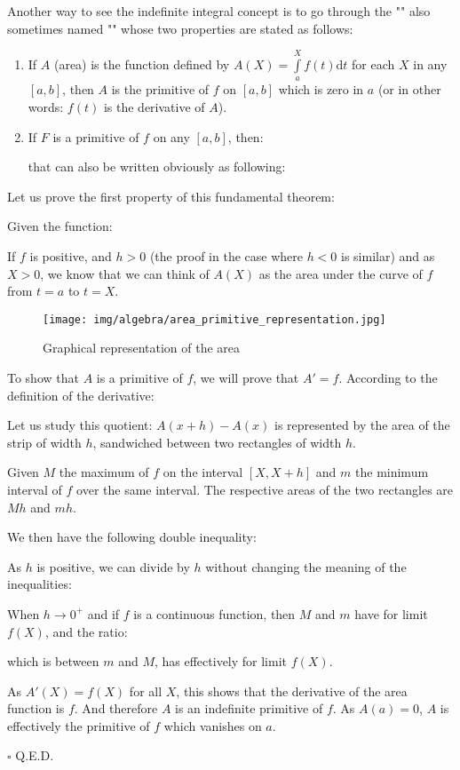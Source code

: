 	
	Another way to see the indefinite integral concept is to go through the "" also sometimes named "\label{fundamental theorem of calculus}" whose two properties are stated as follows:
	\begin{enumerate}
		\item If $A$ (area) is the function defined by $A(X)=\displaystyle\int\limits_a^X f(t)\mathrm{d}t$ for each $X$ in any $[a, b]$, then $A$ is the primitive of $f$ on $[a, b]$ which is zero in $a$ (or in other words: $f (t)$ is the derivative of $A$).
		\item If $F$ is a primitive of $f$ on any $[a, b]$, then:
		
		that can also be written obviously as following:
		
	\end{enumerate}
	Let us prove the first property of this fundamental theorem:
	\begin{dem}
	Given the function:
	
	If $f$ is positive, and $h>0$ (the proof in the case where $h<0$ is similar) and as $X>0$, we know that we can think of $A(X)$ as the area under the curve of $f$ from $t=a$ to $t=X$.
	\begin{figure}[H]
		\centering
		\texttt{[image: img/algebra/area\_primitive\_representation.jpg]}
		\caption{Graphical representation of the area}
	\end{figure}
	To show that $A$ is a primitive of $f$, we will prove that $A'=f$. According to the definition of the derivative:
	
	Let us study this quotient: $A(x+h)-A(x)$ is represented by the area of the strip of width $h$, sandwiched between two rectangles of width $h$.
	
		Given $M$ the maximum of $f$ on the interval $[X,X+h]$ and $m$ the minimum interval of $f$ over the same interval. The respective areas of the two rectangles are $Mh$ and $mh$.
	
	We then have the following double inequality:
	

	As $h$ is positive, we can divide by $h$ without changing the meaning of  the inequalities:
	
	When $h\rightarrow 0^+$ and if $f$ is a continuous function, then $M$ and $m$ have for limit $f (X)$, and the ratio:
	
	which is between $m$ and $M$, has effectively for limit $f(X)$.
	
	As $A'(X)=f(X)$ for all $X$, this shows that the derivative of the area function is $f$. And therefore $A$ is an indefinite primitive of $f$. As $A(a)=0$, $A$ is effectively the primitive of $f$ which vanishes on $a$.
	\begin{flushright}
		$\square$  Q.E.D.
	\end{flushright}
	\end{dem}
